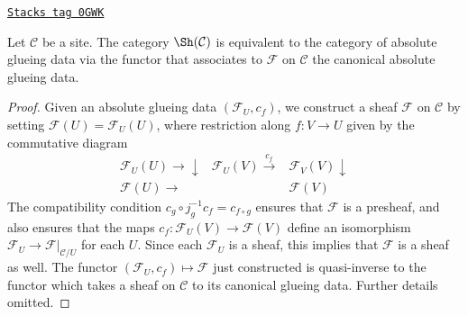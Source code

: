 \begin{lemma}
\label{sites-lemma-glue-sheaves-absolute}
\href{https://stacks.math.columbia.edu/tag/0GWK}{\texttt{Stacks tag 0GWK}}

Let $\mathcal{C}$ be a site. The category
$\Sh(\mathcal{C})$ is equivalent to the category
of absolute glueing data via the functor that
associates to $\mathcal{F}$ on $\mathcal{C}$ the
canonical absolute glueing data.
\end{lemma}

\begin{proof}
Given an absolute glueing data $(\mathcal{F}_U, c_f)$,
we construct a sheaf $\mathcal{F}$ on $\mathcal{C}$ by
setting $\mathcal{F}(U) = \mathcal{F}_U(U)$, where restriction
along $f : V \to U$ given by the commutative diagram
$$
\begin{array}{ccc}\mathcal{F}_U(U) \longrightarrow\downarrow & \mathcal{F}_U(V) \overset{c_f}{\longrightarrow} & \mathcal{F}_V(V) \downarrow \\ \mathcal{F}(U) \longrightarrow &  & \mathcal{F}(V)\end{array}
$$
The compatibility condition $c_g \circ j_{g}^{-1} c_f = c_{f \circ g}$
ensures that $\mathcal{F}$ is a presheaf, and also ensures that the maps
$c_f : \mathcal{F}_U(V) \to \mathcal{F}(V)$ define an isomorphism
$\mathcal{F}_U \to \mathcal{F}|_{\mathcal{C}/U}$ for each $U$.
Since each $\mathcal{F}_U$ is a sheaf, this implies that $\mathcal{F}$
is a sheaf as well. The functor $(\mathcal{F}_U, c_f) \mapsto \mathcal{F}$
just constructed is quasi-inverse to the functor which takes a sheaf
on $\mathcal{C}$ to its canonical glueing data. Further details omitted.
\end{proof}

